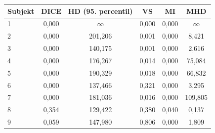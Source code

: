 \begin{tabular}{l c c c c c}
 \hline
Subjekt & DICE & HD (95. percentil) & VS & MI & MHD \\ \hline
1 & 0,000 & $\infty$ & 0,000 & 0,000 & $\infty$ \\
2 & 0,000 & 201,206 & 0,001 & 0,000 & 8,421 \\
3 & 0,000 & 140,175 & 0,001 & 0,000 & 2,616 \\
4 & 0,000 & 176,267 & 0,014 & 0,000 & 75,084 \\
5 & 0,000 & 190,329 & 0,018 & 0,000 & 66,832 \\
6 & 0,000 & 137,466 & 0,321 & 0,000 & 3,295 \\
7 & 0,000 & 181,036 & 0,016 & 0,000 & 109,805 \\
8 & 0,354 & 129,422 & 0,380 & 0,040 & 0,137 \\
9 & 0,059 & 147,980 & 0,806 & 0,000 & 1,809 \\
\hline 
 \end{tabular}
